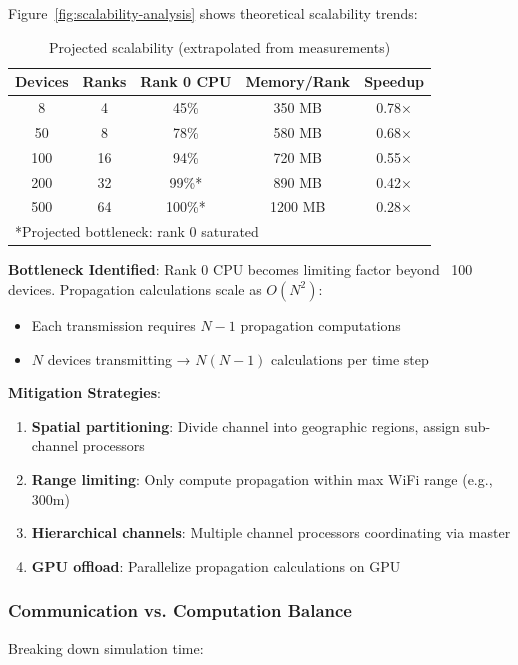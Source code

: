 Figure~\ref{fig:scalability-analysis} shows theoretical scalability trends:

\begin{table}[htbp]
\centering
\caption{Projected scalability (extrapolated from measurements)}
\label{tab:scalability-projection}
\begin{tabular}{@{}ccccc@{}}
\toprule
\textbf{Devices} & \textbf{Ranks} & \textbf{Rank 0 CPU} & \textbf{Memory/Rank} & \textbf{Speedup} \\
\midrule
8 & 4 & 45\% & 350 MB & 0.78× \\
50 & 8 & 78\% & 580 MB & 0.68× \\
100 & 16 & 94\% & 720 MB & 0.55× \\
200 & 32 & 99\%* & 890 MB & 0.42× \\
500 & 64 & 100\%* & 1200 MB & 0.28× \\
\bottomrule
\multicolumn{5}{l}{*Projected bottleneck: rank 0 saturated}
\end{tabular}
\end{table}

\textbf{Bottleneck Identified}:
Rank 0 CPU becomes limiting factor beyond ~100 devices. Propagation calculations scale as $O(N^2)$:
\begin{itemize}
    \item Each transmission requires $N-1$ propagation computations
    \item $N$ devices transmitting → $N(N-1)$ calculations per time step
\end{itemize}

\textbf{Mitigation Strategies}:
\begin{enumerate}
    \item \textbf{Spatial partitioning}: Divide channel into geographic regions, assign sub-channel processors
    \item \textbf{Range limiting}: Only compute propagation within max WiFi range (e.g., 300m)
    \item \textbf{Hierarchical channels}: Multiple channel processors coordinating via master
    \item \textbf{GPU offload}: Parallelize propagation calculations on GPU
\end{enumerate}

\subsubsection{Communication vs. Computation Balance}

Breaking down simulation time:

